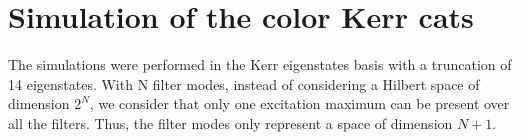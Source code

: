 \section{\label{sec:appendixC} Simulation of the color Kerr cats}

The simulations were performed in the Kerr eigenstates basis with a truncation of 14 eigenstates. With N filter modes, instead of considering a Hilbert space of dimension $2^N$, we consider that only one excitation maximum can be present over all the filters. Thus, the filter modes only represent a space of dimension $N+1$.


